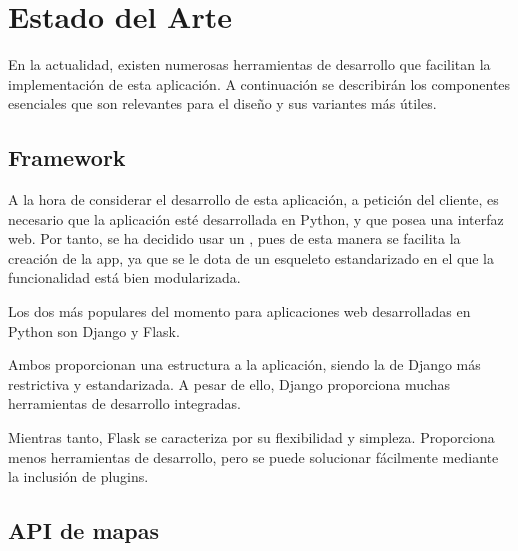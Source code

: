   
\chapter{Estado del Arte\label{CAP:ESTADOARTE}}
  En la actualidad, existen numerosas herramientas de desarrollo que facilitan la implementación de esta aplicación. A continuación se describirán los componentes esenciales que son relevantes para el diseño y sus variantes más útiles.


  \section{Framework}
    A la hora de considerar el desarrollo de esta aplicación, a petición del cliente, es necesario que la aplicación esté desarrollada en Python, y que posea una interfaz web.
    Por tanto, se ha decidido usar un , pues de esta manera se facilita la creación de la app, ya que se le dota de un esqueleto estandarizado en el que la funcionalidad está bien modularizada.
    
    Los dos  más populares del momento para aplicaciones web desarrolladas en Python son Django\cite{django} y Flask\cite{flask}.

    Ambos proporcionan una estructura a la aplicación, siendo la de Django más restrictiva y estandarizada. A pesar de ello, Django proporciona muchas herramientas de desarrollo integradas.
    
    Mientras tanto, Flask se caracteriza por su flexibilidad y simpleza. Proporciona menos herramientas de desarrollo, pero se puede solucionar fácilmente mediante la inclusión de plugins.
    
  
  \section{API de mapas}
  
